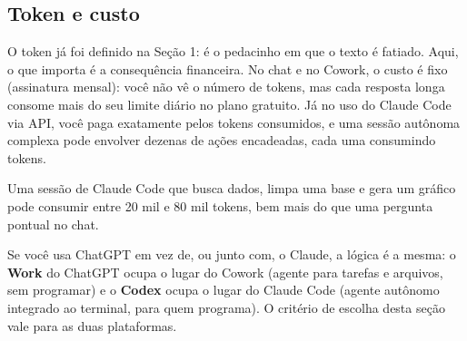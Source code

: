 \documentclass[11pt,a4paper]{article}
\begin{document}
\subsection*{Token e custo}
O token já foi definido na Seção 1: é o pedacinho em que o texto é fatiado. Aqui, o que importa é a consequência financeira. No chat e no Cowork, o custo é fixo (assinatura mensal): você não vê o número de tokens, mas cada resposta longa consome mais do seu limite diário no plano gratuito. Já no uso do Claude Code via API, você paga exatamente pelos tokens consumidos, e uma sessão autônoma complexa pode envolver dezenas de ações encadeadas, cada uma consumindo tokens.
\begin{dica}
Uma sessão de Claude Code que busca dados, limpa uma base e gera um gráfico pode consumir entre 20 mil e 80 mil tokens, bem mais do que uma pergunta pontual no chat.
\end{dica}

\begin{dica}
Se você usa ChatGPT em vez de, ou junto com, o Claude, a lógica é a mesma: o \textbf{Work} do ChatGPT ocupa o lugar do Cowork (agente para tarefas e arquivos, sem programar) e o \textbf{Codex} ocupa o lugar do Claude Code (agente autônomo integrado ao terminal, para quem programa). O critério de escolha desta seção vale para as duas plataformas.
\end{dica}
\end{document}
